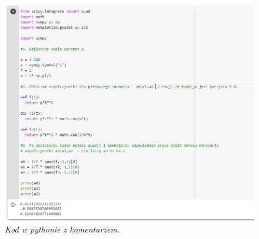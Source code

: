 \documentclass[12pt,oneside,a4paper]{book} %
\begin{document}
\begin{figure}[h]
\begin{center} 
\includegraphics[scale=0.7]{./images/RozwiazanieA.PNG} 
\caption{\textit{Kod w pythonie z komentarzem.}\newline }
\label{rys:logoup}
\end{center}
\end{figure}





\end{document}
